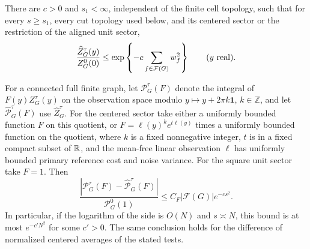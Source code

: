 \begin{lemma}\label{ent:cutoff-bounds}
There are \(c>0\) and \(s_1<\infty\), independent of the finite
cell topology, such that for every \(s\ge s_1\), every cut topology
used below, and its centered sector or the restriction of the aligned
unit sector,
\begin{equation}\label{ent:pointwise-cutoff}
 \frac{\widehat Z_G^\tau(y)}{Z_G^0(0)}
       \le \exp\left\{-c\sum_{f\in\mathcal F(G)}w_f^2\right\}
                    \qquad(y\hbox{ real}).
\end{equation}

For a connected full finite graph, let
\(\mathcal P_G^\tau(F)\) denote the integral of \(F(y)Z_G^\tau(y)\)
on the observation space modulo \(y\mapsto y+2\pi k\mathbf1\),
\(k\in\mathbb Z\), and let \(\widehat{\mathcal P}_G^\tau(F)\) use
\(\widehat Z_G^\tau\).  For the centered sector take either a uniformly
bounded function \(F\) on this quotient, or
\(F=\ell(y)^k e^{t\ell(y)}\) times a uniformly bounded function on
the quotient, where \(k\) is a fixed nonnegative integer,
\(t\) is in a fixed compact subset of \(\mathbb R\), and the mean-free linear observation
\(\ell\) has uniformly bounded primary reference cost and noise
variance.  For the square unit sector take \(F=1\).
Then
\begin{equation}\label{ent:cutoff-loss}
 \frac{\left|\mathcal P_G^\tau(F)
             -\widehat{\mathcal P}_G^\tau(F)\right|}
      {\mathcal P_G^0(1)}
       \le C_F|\mathcal F(G)|e^{-cs^2}.
\end{equation}
In particular, if the logarithm of the side is \(O(N)\) and
\(s\asymp N\), this bound is at most \(e^{-c'N^2}\) for some
\(c'>0\).  The same conclusion holds for the difference of normalized
centered averages of the stated tests.
\end{lemma}

